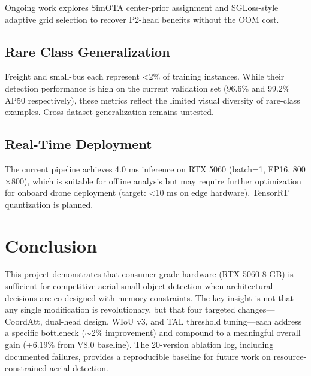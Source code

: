 \documentclass[11pt]{article}
\begin{document}
Ongoing work explores SimOTA center-prior assignment and SGLoss-style adaptive grid selection
\cite{li2022generalized} to recover P2-head benefits without the OOM cost.

\subsection{Rare Class Generalization}

Freight and small-bus each represent <2\% of training instances. While their detection
performance is high on the current validation set (96.6\% and 99.2\% AP50 respectively),
these metrics reflect the limited visual diversity of rare-class examples. Cross-dataset
generalization remains untested.

\subsection{Real-Time Deployment}

The current pipeline achieves 4.0 ms inference on RTX 5060 (batch=1, FP16, 800$\times$800),
which is suitable for offline analysis but may require further optimization for onboard
drone deployment (target: <10 ms on edge hardware). TensorRT quantization is planned.

\section{Conclusion}

This project demonstrates that consumer-grade hardware (RTX 5060 8 GB) is sufficient for
competitive aerial small-object detection when architectural decisions are co-designed with
memory constraints. The key insight is not that any single modification is revolutionary, but
that four targeted changes—CoordAtt, dual-head design, WIoU v3, and TAL threshold tuning—each
address a specific bottleneck ($\sim$2\% improvement) and compound to a meaningful overall gain
(+6.19\% from V8.0 baseline). The 20-version ablation log, including documented failures,
provides a reproducible baseline for future work on resource-constrained aerial detection.

\end{document}
